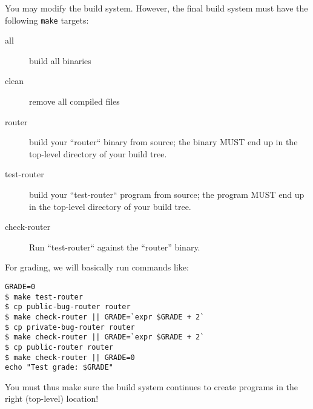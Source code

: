 \documentclass{article}
\begin{document}
You may modify the build system. However, the final build system must
have the following {\tt make} targets:

\begin{description}
\item[all] build all binaries
\item[clean] remove all compiled files
\item[router] build your ``router`` binary from source; the binary MUST end up in the top-level directory of your build tree.
\item[test-router] build your ``test-router`` program from source; the program MUST end up in the top-level directory of your build tree.
\item[check-router] Run ``test-router`` against the ``router'' binary.
\end{description}

For grading, we will basically run commands like:
\begin{verbatim}
GRADE=0
$ make test-router
$ cp public-bug-router router
$ make check-router || GRADE=`expr $GRADE + 2`
$ cp private-bug-router router
$ make check-router || GRADE=`expr $GRADE + 2`
$ cp public-router router
$ make check-router || GRADE=0
echo "Test grade: $GRADE"
\end{verbatim}
You must thus make sure the build system continues to create programs in the
right (top-level) location!





\end{document}
